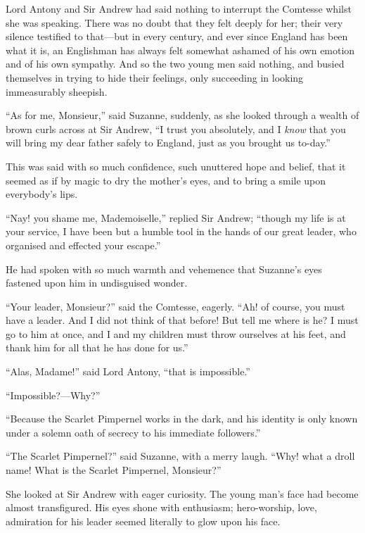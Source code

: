 Lord Antony and Sir Andrew had said nothing to interrupt the Comtesse whilst she was speaking. There was no doubt that they felt deeply for her; their very silence testified to that---but in every century, and ever since England has been what it is, an Englishman has always felt somewhat ashamed of his own emotion and of his own sympathy. And so the two young men said nothing, and busied themselves in trying to hide their feelings, only succeeding in looking immeasurably sheepish.

\enquote{As for me, Monsieur,} said Suzanne, suddenly, as she looked through a wealth of brown curls across at Sir Andrew, \enquote{I trust you absolutely, and I \textit{know} that you will bring my dear father safely to England, just as you brought us to-day.}

This was said with so much confidence, such unuttered hope and belief, that it seemed as if by magic to dry the mother's eyes, and to bring a smile upon everybody's lips.

\enquote{Nay! you shame me, Mademoiselle,} replied Sir Andrew; \enquote{though my life is at your service, I have been but a humble tool in the hands of our great leader, who organised and effected your escape.}

He had spoken with so much warmth and vehemence that Suzanne's eyes fastened upon him in undisguised wonder.

\enquote{Your leader, Monsieur?} said the Comtesse, eagerly. \enquote{Ah! of course, you must have a leader. And I did not think of that before! But tell me where is he? I must go to him at once, and I and my children must throw ourselves at his feet, and thank him for all that he has done for us.}

\enquote{Alas, Madame!} said Lord Antony, \enquote{that is impossible.}

\enquote{Impossible?---Why?}

\enquote{Because the Scarlet Pimpernel works in the dark, and his identity is only known under a solemn oath of secrecy to his immediate followers.}

\enquote{The Scarlet Pimpernel?} said Suzanne, with a merry laugh. \enquote{Why! what a droll name! What is the Scarlet Pimpernel, Monsieur?}

She looked at Sir Andrew with eager curiosity. The young man's face had become almost transfigured. His eyes shone with enthusiasm; hero-worship, love, admiration for his leader seemed literally to glow upon his face.

